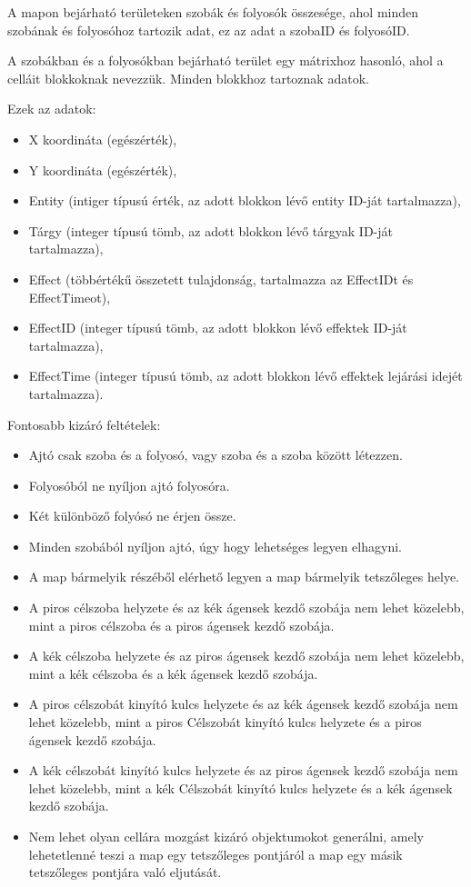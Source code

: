 \noindent A mapon bejárható területeken szobák és folyosók összesége, ahol minden szobának és folyosóhoz tartozik adat, ez az adat a szobaID és folyosóID.

A szobákban és a folyosókban bejárható terület egy mátrixhoz hasonló, ahol a celláit blokkoknak nevezzük.
Minden blokkhoz tartoznak adatok.

\noindent Ezek az adatok:

\begin{itemize}
    \item X koordináta (egészérték),
    \item Y koordináta (egészérték),
    \item Entity (intiger típusú érték,  az adott blokkon lévő entity ID-ját tartalmazza),
    \item Tárgy (integer típusú tömb, az adott blokkon lévő tárgyak ID-ját tartalmazza),
    \item Effect (többértékű összetett tulajdonság, tartalmazza az EffectIDt és EffectTimeot),
    \item EffectID (integer típusú tömb, az adott blokkon lévő effektek ID-ját tartalmazza),
    \item EffectTime (integer típusú tömb, az adott blokkon lévő effektek lejárási idejét tartalmazza).
\end{itemize}

\noindent Fontosabb kizáró feltételek:

\begin{itemize}
    \item Ajtó csak szoba és a folyosó, vagy szoba és a szoba között létezzen.
    \item Folyosóból ne nyíljon ajtó folyosóra.
    \item Két különböző folyósó ne érjen össze.
    \item Minden szobából nyíljon ajtó, úgy hogy lehetséges legyen elhagyni.
    \item A map bármelyik részéből elérhető legyen a map bármelyik tetszőleges helye.
    \item A piros célszoba helyzete és az kék ágensek kezdő szobája nem lehet közelebb, mint a piros célszoba és a piros ágensek kezdő szobája.
    \item A kék célszoba helyzete és az piros ágensek kezdő szobája nem lehet közelebb, mint a kék célszoba és a kék ágensek kezdő szobája.
    \item A piros célszobát kinyító kulcs helyzete és az kék ágensek kezdő szobája nem lehet közelebb, mint a piros Célszobát kinyító kulcs helyzete és a piros ágensek kezdő szobája.
    \item A kék célszobát kinyító kulcs helyzete és az piros ágensek kezdő szobája nem lehet közelebb, mint a kék Célszobát kinyító kulcs helyzete és a kék ágensek kezdő szobája.
    \item Nem lehet olyan cellára mozgást kizáró objektumokot generálni, amely lehetetlenné teszi a map egy tetszőleges pontjáról a map egy másik tetszőleges pontjára való eljutását.
\end{itemize}

